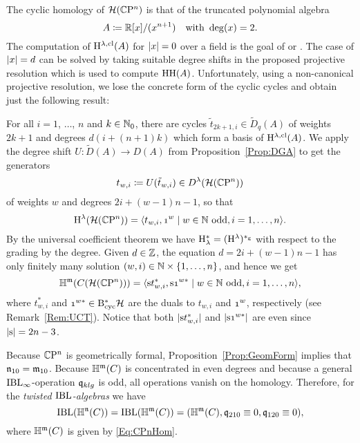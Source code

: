 \documentclass[\MainFolder/Text.tex]{subfiles}
\begin{document}
The cyclic homology of $\mathcal{H}(\mathbb{C}\mathrm{P}^n)$ is that of the truncated polynomial algebra $$ A \coloneqq\mathbb{R}[x]/(x^{n+1})\quad\text{with }\operatorname{deg}(x)=2. $$
The computation of $\mathrm{H}^{\lambda,\mathrm{cl}}(A)$ for $|x|=0$ over a field is the goal of \cite[Exercise 4.1.8.]{LodayCyclic} or \cite[Exercise 9.1.1]{Weibel1994}. The case of $|x| = d$ can be solved by taking suitable degree shifts in the proposed projective resolution which is used to compute $\mathrm{H}\mathrm{H}(A)$. Unfortunately, using a non-canonical projective resolution, we lose the concrete form of the cyclic cycles and obtain just the following result:

For all $i=1$, $\dotsc$, $n$ and $k\in \mathbb{N}_0$, there are cycles $\tilde{t}_{2k+1,i}\in  \tilde{D}_q(A)$ of weights $2k+1$ and degrees $d(i+(n+1)k)$ which form a basis of $\mathrm{H}^{\lambda,\mathrm{cl}}(A)$. We apply the degree shift $U: \tilde{D}(A) \rightarrow D(A)$ from Proposition~\ref{Prop:DGA} to get the generators
$$ t_{w,i} \coloneqq U(\tilde{t}_{w,i}) \in D^\lambda( \mathcal{H}(\mathbb{C}\mathrm{P}^n)) $$
of weights $w$ and degrees $2i+ (w-1)n -1$, so that
$$ \H^\lambda(\Harm(\CP^n)) = \langle t_{w,i}, \NOne^{w} \mid w\in \N \text{ odd}, i=1,\dotsc, n\rangle. $$
By the universal coefficient theorem we have $\mathrm{H}_\lambda^* = (\mathrm{H}^\lambda)^{*_{\mathrm{g}}}$ with respect to the grading by the degree. Given $d\in \mathbb{Z}$, the equation $d= 2i + (w-1)n - 1$ has only finitely many solution $(w,i) \in \mathbb{N} \times \{1,\dotsc,n\}$, and hence we get
\begin{equation}\label{Eq:CPnHom}
\HIBL^\MC(\CycC(\Harm(\CP^n))) = \langle \Susp t_{w,i}^*, \Susp\NOne^{w*} \mid w\in \N \text{ odd}, i=1,\dotsc, n \rangle,
\end{equation}
where $t_{w,i}^*$ and $\NOne^{w*} \in \DBCyc \Harm$ are the duals to $t_{w,i}$ and $\NOne^{w}$, respectively (see Remark~\ref{Rem:UCT}). Notice that both $|\mathrm{s} t_{w,i}^*|$ and $\Abs{\Susp \NOne^{w*}}$ are even since $|\mathrm{s}| = 2n-3$.

Because $\mathbb{C}\mathrm{P}^n$ is geometrically formal, Proposition~\ref{Prop:GeomForm} implies that $\mathfrak{n}_{10} = \mathfrak{m}_{10}$. Because $\mathbb{H}^{\mathfrak{m}}(C)$ is concentrated in even degrees and because a general $\mathrm{IBL}_\infty$-operation $\mathfrak{q}_{klg}$ is odd, all operations vanish on the homology. Therefore, for the \emph{twisted $\mathrm{IBL}$-algebras} we have
\begin{equation*}
\mathrm{IBL}(\mathbb{H}^{\mathfrak{n}}(C)) = \mathrm{IBL}(\mathbb{H}^{\mathfrak{m}}(C)) = (\mathbb{H}^{\mathfrak{m}}(C), \mathfrak{q}_{210} \equiv 0, \mathfrak{q}_{120}\equiv 0),
\end{equation*}
where $\mathbb{H}^{\mathfrak{m}}(C)$ is given by \eqref{Eq:CPnHom}.
\end{document}

